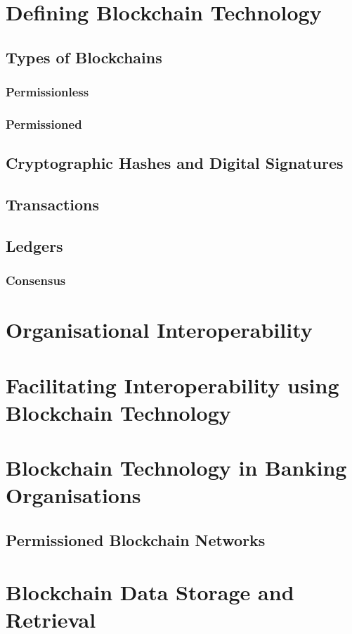 \section{Defining Blockchain Technology}

\subsection{Types of Blockchains}

\subsubsection{Permissionless}

\subsubsection{Permissioned}

\subsection{Cryptographic Hashes and Digital Signatures}

\subsection{Transactions}

\subsection{Ledgers}

\subsubsection{Consensus}

\section{Organisational Interoperability}

\section{Facilitating Interoperability using Blockchain Technology}

\section{Blockchain Technology in Banking Organisations}

\subsection{Permissioned Blockchain Networks}

\section{Blockchain Data Storage and Retrieval}